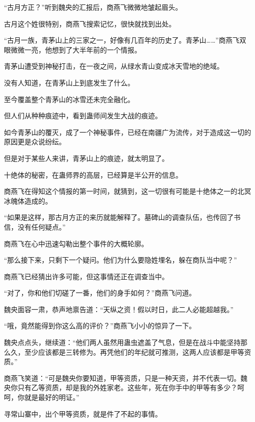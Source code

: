 
\begin{this_body}



“古月方正？”听到魏央的汇报后，商燕飞微微地皱起眉头。

古月这个姓很特别，商燕飞搜索记忆，很快就找到出处。

“古月一族，青茅山上的三家之一，好像有几百年的历史了。青茅山……”商燕飞双眼微微一亮，他想到了大半年前的一个情报。

青茅山遭受到神秘打击，在一夜之间，从绿水青山变成冰天雪地的绝域。

没有人知道，在青茅山上到底发生了什么。

至今覆盖整个青茅山的冰雪还未完全融化。

但人们从种种痕迹中，看到蛊师间发生大战的痕迹。

如今青茅山的覆灭，成了一个神秘事件，已经在南疆广为流传，对于造成这一切的原因更是众说纷纭。

但是对于某些人来讲，青茅山上的痕迹，就太明显了。

十绝体的秘密，在蛊师界的高层，已经算是半公开的信息。

商燕飞在得知这个情报的第一时间，就猜到，这一切很有可能是十绝体之一的北冥冰魄体造成的。

“如果是这样，那古月方正的来历就能解释了。墓碑山的调查队伍，也传回了书信，没有任何疑点。”

商燕飞在心中迅速勾勒出整个事件的大概轮廓。

“那么接下来，只剩下一个疑问。他们为什么要隐姓埋名，躲在商队当中呢？”

商燕飞已经猜出许多可能，但这事情还正在调查当中。

“对了，你和他们切磋了一番，他们的身手如何？”商燕飞问道。

魏央面容一肃，恭声地禀告道：“天纵之资！假以时日，此二人必能超越我。”

“哦，竟然能得到你这么高的评价？”商燕飞小小的惊异了一下。

魏央点点头，继续道：“他们两人虽然用蛊虫遮盖了气息，但是在战斗中能坚持那么久，至少应该都是三转修为。再凭他们的年纪就可推测，这两人应该都是甲等资质。”

商燕飞笑道：“可是魏央你要知道，甲等资质，只是一种天资，并不代表一切。魏央你只有乙等资质，却是我的外姓家老。这些年，死在你手中的甲等有多少？呵呵，你就是最好的明证。”

寻常山寨中，出个甲等资质，就是件了不起的事情。


\end{this_body}
